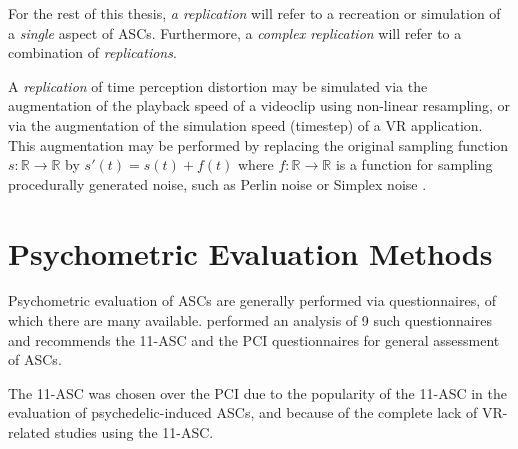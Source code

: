 For the rest of this thesis, \textit{a replication} will refer to a recreation or simulation of a \textit{single} aspect of \acp{ASC}. Furthermore, a \textit{complex replication} will refer to a combination of \textit{replications}.

A \textit{replication} of time perception distortion may be simulated via the augmentation of the playback speed of a videoclip using non-linear resampling, or via the augmentation of the simulation speed (timestep) of a \ac{VR} application. This augmentation may be performed by replacing the original sampling function $s \colon \mathbb{R} \to \mathbb{R}$ by $s'(t) = s(t) + f(t)$ where $f \colon \mathbb{R} \to \mathbb{R}$ is a function for sampling procedurally generated noise, such as Perlin noise \autocite{perlin1985image} or Simplex noise \autocite{olano2002simplex}.

\section{Psychometric Evaluation Methods}
Psychometric evaluation of \acp{ASC} are generally performed via questionnaires, of which there are many available.
\textcites{schmidt2018empirische}{figueiredobuilding} performed an analysis of 9 such questionnaires and recommends the \acf{11-ASC} and the \ac{PCI} questionnaires for general assessment of \acp{ASC}.

The \ac{11-ASC} was chosen over the \ac{PCI} due to the popularity of the \ac{11-ASC} in the evaluation of psychedelic-induced \acp{ASC}, and because of the complete lack of \ac{VR}-related studies using the \ac{11-ASC}.

